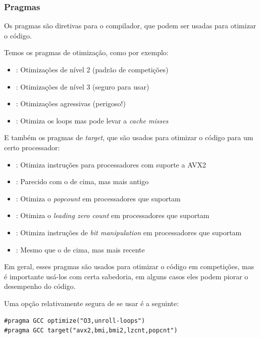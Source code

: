 \subsubsection{Pragmas}

Os pragmas são diretivas para o compilador, que podem ser usadas para otimizar o código.

Temos os pragmas de otimização, como por exemplo:
\begin{itemize}\setlength\itemsep{0pt}
    \item {}: Otimizações de nível 2 (padrão de competições)
    \item {}: Otimizações de nível 3 (seguro para usar)
    \item {}: Otimizações agressivas (perigoso!)
    \item {}: Otimiza os loops mas pode levar a \textit{cache misses}
\end{itemize}

E também os pragmas de \textit{target}, que são usados para otimizar o código para um certo processador:
\begin{itemize}\setlength\itemsep{0pt}
    \item {}: Otimiza instruções para processadores com suporte a AVX2
    \item {}: Parecido com o de cima, mas mais antigo
    \item {}: Otimiza o \textit{popcount} em processadores que suportam
    \item {}: Otimiza o \textit{leading zero count} em processadores que suportam
    \item {}: Otimiza instruções de \textit{bit manipulation} em processadores que suportam
    \item {}: Mesmo que o de cima, mas mais recente
\end{itemize}

Em geral, esses pragmas são usados para otimizar o código em competições, mas é importante usá-los com certa sabedoria, em alguns casos eles podem piorar o desempenho do código.

Uma opção relativamente segura de se usar é a seguinte:
\begin{verbatim}
#pragma GCC optimize("O3,unroll-loops")
#pragma GCC target("avx2,bmi,bmi2,lzcnt,popcnt")
\end{verbatim}

